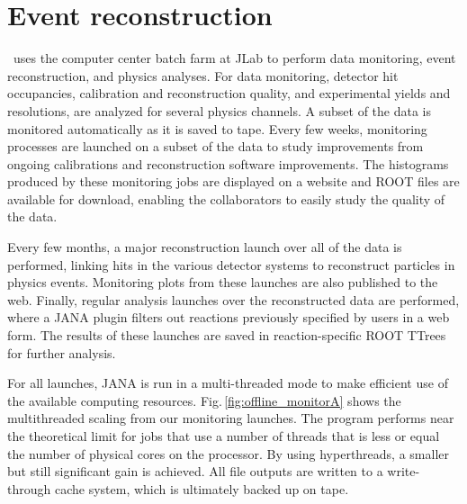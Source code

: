 

\section[Event reconstruction]{Event reconstruction \label{sec:reconstruction}}


\GX~uses the computer center batch farm at JLab to perform data monitoring, event reconstruction, and physics analyses.  For data monitoring, detector hit occupancies, calibration and reconstruction quality, and experimental yields and resolutions, are analyzed for several physics channels.  A subset of the data is monitored automatically as it is saved to tape.  Every few weeks, monitoring processes are launched on a subset of the data to study improvements from ongoing calibrations and reconstruction software improvements.  The histograms produced by these monitoring jobs are displayed on a website and ROOT files are available for download, enabling the collaborators to easily study the quality of the data. 

Every few months, a major reconstruction launch over all of the data is performed, linking hits in the various detector systems to reconstruct particles in physics events.  Monitoring plots from these launches are also published to the web. Finally, regular analysis launches over the reconstructed data are performed, where a JANA plugin filters out reactions previously specified by users in a web form. The results of these launches are saved in reaction-specific ROOT TTrees for further analysis.

For all launches, JANA is run in a multi-threaded mode to make efficient use of the available computing resources. Fig.\,\ref{fig:offline_monitorA} shows the multithreaded scaling from our monitoring launches. The program performs near the theoretical limit for jobs that use a number of threads that is less or equal the number of physical cores on the processor. By using hyperthreads, a smaller but still significant gain is achieved.
All file outputs are written to a write-through cache system, which is ultimately backed up on tape.


